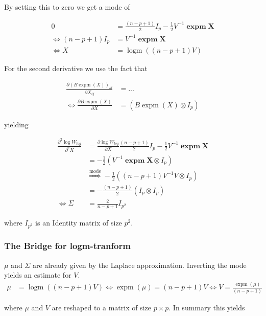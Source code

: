 By setting this to zero we get a mode of

\begin{align}
	0 &=  \frac{(n-p+1)}{2} I_p - \frac{1}{2}V^{-1}\mathbf{\operatorname{expm}X} \\
	\Leftrightarrow (n-p+1)I_p &= V^{-1}\mathbf{\operatorname{expm}X} \\
	\Leftrightarrow X &= \operatorname{logm}((n-p+1)V)
\end{align}

For the second derivative we use the fact that

\begin{align}
	\frac{\partial (B\operatorname{expm}(X))_{kl}}{\partial X_{ij}} &= ... \\
	\Leftrightarrow \frac{\partial B\operatorname{expm}(X)}{\partial X} &= \left(B\operatorname{expm}(X) \otimes I_p\right)
\end{align}

yielding

\begin{align}
	\frac{\partial^2 \log W_{log}}{\partial^2 X} &= \frac{\partial \log W_{log}}{\partial X}  \frac{(n-p+1)}{2} I_p - \frac{1}{2}V^{-1}\mathbf{\operatorname{expm}X} \\
	&= -\frac{1}{2}(V^{-1}\mathbf{\operatorname{expm}X} \otimes I_p) \\
	&\overset{\text{mode}}{\Rightarrow} -\frac{1}{2}((n-p+1)V^{-1}V \otimes I_p) \\
	&= -\frac{(n-p+1)}{2} (I_p \otimes I_p)\\
	\Leftrightarrow \Sigma &= \frac{2}{n-p+1} I_{p^2}
\end{align}

where $I_{p^2}$ is an Identity matrix of size $p^2$. 

\subsubsection{The Bridge for logm-tranform}

$\mu$ and $\Sigma$ are already given by the Laplace approximation. Inverting the mode yields an estimate for $V$. 
\begin{align}
	\mu &= \operatorname{logm}((n-p+1)V) \Leftrightarrow \operatorname{expm}(\mu) = (n-p+1)V \Leftrightarrow V = \frac{\operatorname{expm}(\mu)}{(n-p+1)}
\end{align}

where $\mu$ and $V$ are reshaped to a matrix of size $p\times p$. In summary this yields

